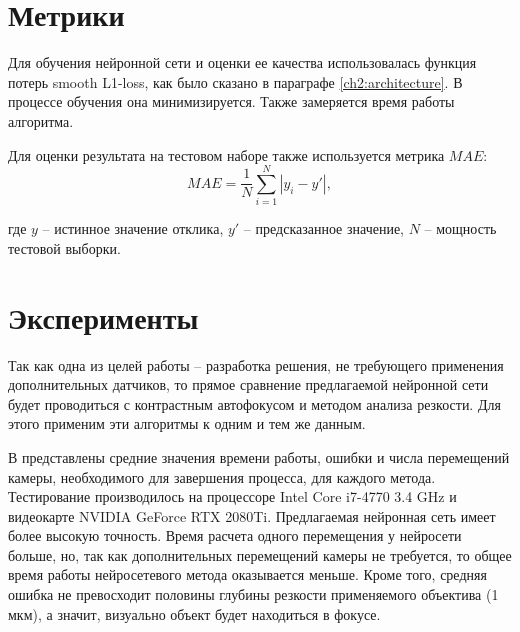 \section{Метрики}
Для обучения нейронной сети и оценки ее качества использовалась функция потерь smooth L1-loss, как было сказано в параграфе \ref{ch2:architecture}. В процессе обучения она минимизируется. Также замеряется время работы алгоритма.

Для оценки результата на тестовом наборе также используется метрика $MAE$:
\begin{equation}
	MAE = \dfrac{1}{N} \sum\limits_{i=1}^N \left|y_i - y'\right|,
\end{equation}

где $y$ -- истинное значение отклика, $y'$ -- предсказанное значение, $N$ -- мощность тестовой выборки.



\section{Эксперименты} \label{ch3:experiments}


Так как одна из целей работы -- разработка решения, не требующего применения дополнительных датчиков, то прямое сравнение предлагаемой нейронной сети будет проводиться с контрастным автофокусом и методом анализа резкости. Для этого применим эти алгоритмы к одним и тем же данным.

В  представлены средние значения времени работы, ошибки и числа перемещений камеры, необходимого для завершения процесса, для каждого метода. Тестирование производилось на процессоре Intel Core i7-4770 3.4 GHz и видеокарте NVIDIA GeForce RTX 2080Ti. Предлагаемая нейронная сеть имеет более высокую точность. Время расчета одного перемещения у нейросети больше, но, так как дополнительных перемещений камеры не требуется, то общее время работы нейросетевого метода оказывается меньше. Кроме того, средняя ошибка не превосходит половины глубины резкости применяемого объектива (1 мкм), а значит, визуально объект будет находиться в фокусе. 


